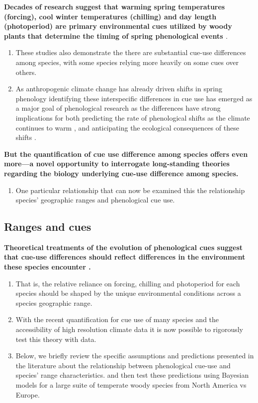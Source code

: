 \documentclass[11pt]{article}\usepackage[]{graphicx}\usepackage[]{color}
\begin{document}
\textbf{Decades of research suggest that warming spring temperatures (forcing), cool winter temperatures (chilling) and day length (photoperiod) are primary environmental cues utilized by woody plants that determine the timing of spring phenological events \cite{}}.
\begin{enumerate}
\item These studies also demonstrate the there are substantial cue-use differences among species, with some species relying more heavily on some cues over others.
\item  As anthropogenic climate change has already driven shifts in spring phenology \citep{} identifying these interspecific differences in cue use has emerged as a major goal of phenological research \citep{} as the differences have strong implications for both predicting the rate of phenological shifts as the climate continues to warm \citep{}, and anticipating the ecological consequences of these shifts \citep{}.
\end{enumerate}
\textbf{ But the quantification of cue use difference among species offers even more---a novel opportunity to interrogate long-standing theories regarding the biology underlying cue-use difference among species.}
\begin{enumerate}
\item One particular relationship that can now be examined this the relationship species' geographic ranges and phenological cue use.
\end{enumerate}
\subsection*{Ranges and cues}
\textbf{Theoretical treatments of the evolution of phenological cues suggest that cue-use differences should reflect differences in the  environment these species encounter \citep{}.}
\begin{enumerate}
\item That is, the relative reliance on forcing, chilling and photoperiod for each species should be shaped by the unique environmental conditions across a species geographic range.
\item With the recent quantification for cue use of many species \citep{} and the accessibility of high resolution climate data it is now possible to rigorously test this theory with data.
\item Below, we briefly review the specific assumptions and predictions presented in the literature about the relationship between phenological cue-use and species' range characteristics. and then test these predictions using Bayesian models for a large suite of temperate woody species from North America vs Europe.

\end{enumerate}
\end{document}
